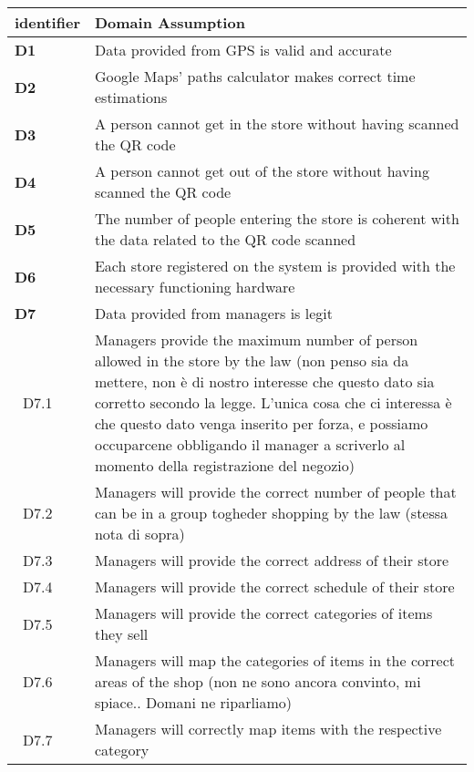 \begin{table}[h!]
    \centering
    \begin{tabular}{@{}P{0.1\textwidth}P{0.80\textwidth}@{}}
        \toprule
        \textbf{identifier}& \textbf{Domain Assumption}\\
        \midrule
        \textbf{D1}        & Data provided from GPS is valid and accurate\\
        \textbf{D2}        & Google Maps' paths calculator makes correct time estimations\\
        \textbf{D3}        & A person cannot get in the store without having scanned the QR code\\
        \textbf{D4}        & A person cannot get out of the store without having scanned the QR code\\
        \textbf{D5}        & The number of people entering the store is coherent with the data related to the QR code scanned\\
        \textbf{D6}        & Each store registered on the system is provided with the necessary functioning hardware\\
        \textbf{D7}        & Data provided from managers is legit\\
        $\;\;$D7.1         & Managers provide the maximum number of person allowed in the store by the law (non penso sia da mettere, non è di nostro interesse che questo dato sia corretto secondo la legge. L'unica cosa che ci interessa è che questo dato venga inserito per forza, e possiamo occuparcene obbligando il manager a scriverlo al momento della registrazione del negozio)\\
        $\;\;$D7.2         & Managers will provide the correct number of people that can be in a group togheder shopping by the law (stessa nota di sopra)\\
        $\;\;$D7.3         & Managers will provide the correct address of their store\\
        $\;\;$D7.4         & Managers will provide the correct schedule of their store\\
        $\;\;$D7.5         & Managers will provide the correct categories of items they sell\\
        $\;\;$D7.6         & Managers will map the categories of items in the correct areas of the shop (non ne sono ancora convinto, mi spiace.. Domani ne riparliamo)\\
        $\;\;$D7.7         & Managers will correctly map items with the respective category\\

\end{tabular}
\end{table}
